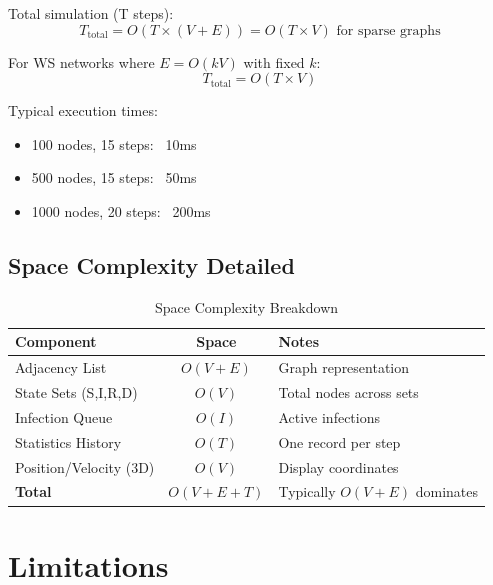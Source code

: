 \documentclass[12pt,a4paper]{article}
\begin{document}
Total simulation (T steps):
\begin{equation}
T_{\text{total}} = O(T \times (V + E)) = O(T \times V) \text{ for sparse graphs}
\end{equation}

For WS networks where $E = O(kV)$ with fixed $k$:
\begin{equation}
T_{\text{total}} = O(T \times V)
\end{equation}

Typical execution times:
\begin{itemize}
    \item 100 nodes, 15 steps: ~10ms
    \item 500 nodes, 15 steps: ~50ms
    \item 1000 nodes, 20 steps: ~200ms
\end{itemize}

\subsection{Space Complexity Detailed}

\begin{table}[h]
\centering
\begin{tabular}{lcl}
\toprule
\textbf{Component} & \textbf{Space} & \textbf{Notes} \\
\midrule
Adjacency List & $O(V + E)$ & Graph representation \\
State Sets (S,I,R,D) & $O(V)$ & Total nodes across sets \\
Infection Queue & $O(I)$ & Active infections \\
Statistics History & $O(T)$ & One record per step \\
Position/Velocity (3D) & $O(V)$ & Display coordinates \\
\midrule
\textbf{Total} & $O(V + E + T)$ & Typically $O(V + E)$ dominates \\
\bottomrule
\end{tabular}
\caption{Space Complexity Breakdown}
\end{table}

\section{Limitations}
\end{document}
